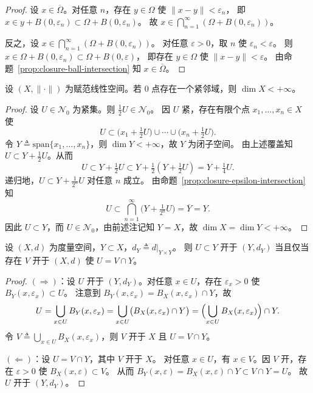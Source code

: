 \documentclass[lang=cn,a4paper,newtx,section]{elegantbook}
\begin{document}
\begin{proof}
  设 $x\in\overline{\Omega}$。对任意 $n$，存在 $y\in\Omega$ 使 $\|x-y\|<\varepsilon_n$，
  即 $x\in y+B(0,\varepsilon_n)\subset\Omega+B(0,\varepsilon_n)$。
  故 $x\in\bigcap_{n=1}^{\infty}(\Omega+B(0,\varepsilon_n))$。

  反之，设 $x\in\bigcap_{n=1}^{\infty}(\Omega+B(0,\varepsilon_n))$。
  对任意 $\varepsilon>0$，取 $n$ 使 $\varepsilon_n<\varepsilon$。
  则 $x\in\Omega+B(0,\varepsilon_n)\subset\Omega+B(0,\varepsilon)$，
  即存在 $y\in\Omega$ 使 $\|x-y\|<\varepsilon$。
  由命题~\ref{prop:closure-ball-intersection} 知 $x\in\overline{\Omega}$。
\end{proof}

\begin{proposition}
  设 $(X,\|\cdot\|)$ 为赋范线性空间。若 $0$ 点存在一个紧邻域，则 $\dim X<+\infty$。
\end{proposition}

\begin{proof}
  设 $U\in\mathcal{N}_0$ 为紧集。则 $\frac{1}{2}U\in\mathcal{N}_0$。
  因 $U$ 紧，存在有限个点 $x_1,\ldots,x_n\in X$ 使
  \[
    U\subset\bigl(x_1+\tfrac{1}{2}U\bigr)\cup\cdots\cup\bigl(x_n+\tfrac{1}{2}U\bigr).
  \]
  令 $Y\triangleq\mathrm{span}\{x_1,\ldots,x_n\}$，则 $\dim Y<+\infty$，故 $Y$ 为闭子空间。
  由上述覆盖知 $U\subset Y+\frac{1}{2}U$。从而
  \[
    U\subset Y+\tfrac{1}{2}U\subset Y+\tfrac{1}{2}(Y+\tfrac{1}{2}U)=Y+\tfrac{1}{4}U.
  \]
  递归地，$U\subset Y+\frac{1}{2^n}U$ 对任意 $n$ 成立。
  由命题~\ref{prop:closure-epsilon-intersection} 知
  \[
    U\subset\bigcap_{n=1}^{\infty}\bigl(Y+\tfrac{1}{2^n}U\bigr)=\overline{Y}=Y.
  \]
  因此 $U\subset Y$，而 $U\in\mathcal{N}_0$，由前述注记知 $Y=X$，故 $\dim X=\dim Y<+\infty$。
\end{proof}

\begin{proposition}\label{prop:subspace-open-characterization}
  设 $(X,d)$ 为度量空间，$Y\subset X$，$d_Y\triangleq d|_{Y\times Y}$。
  则 $U\subset Y$ 开于 $(Y,d_Y)$ 当且仅当存在 $V$ 开于 $(X,d)$ 使 $U=V\cap Y$。
\end{proposition}

\begin{proof}
  $(\Rightarrow)$：设 $U$ 开于 $(Y,d_Y)$。对任意 $x\in U$，存在 $\varepsilon_x>0$ 使 $B_Y(x,\varepsilon_x)\subset U$。
  注意到 $B_Y(x,\varepsilon_x)=B_X(x,\varepsilon_x)\cap Y$，故
  \[
    U=\bigcup_{x\in U}B_Y(x,\varepsilon_x)=\bigcup_{x\in U}\bigl(B_X(x,\varepsilon_x)\cap Y\bigr)=\Bigl(\bigcup_{x\in U}B_X(x,\varepsilon_x)\Bigr)\cap Y.
  \]
  令 $V\triangleq\bigcup_{x\in U}B_X(x,\varepsilon_x)$，则 $V$ 开于 $X$ 且 $U=V\cap Y$。

  $(\Leftarrow)$：设 $U=V\cap Y$，其中 $V$ 开于 $X$。
  对任意 $x\in U$，有 $x\in V$。因 $V$ 开，存在 $\varepsilon>0$ 使 $B_X(x,\varepsilon)\subset V$。
  从而 $B_Y(x,\varepsilon)=B_X(x,\varepsilon)\cap Y\subset V\cap Y=U$。
  故 $U$ 开于 $(Y,d_Y)$。
\end{proof}
\end{document}
